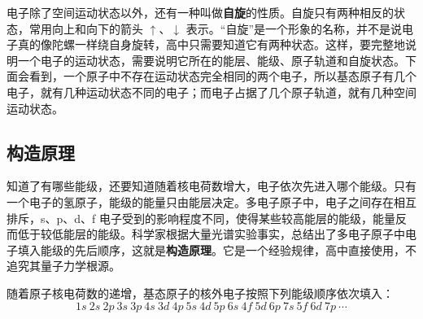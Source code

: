 
电子除了空间运动状态以外，还有一种叫做\textbf{自旋}的性质。自旋只有两种相反的状态，常用向上和向下的箭头 $\uparrow$、$\downarrow$ 表示。“自旋”是一个形象的名称，并不是说电子真的像陀螺一样绕自身旋转，高中只需要知道它有两种状态。这样，要完整地说明一个电子的运动状态，需要说明它所在的能层、能级、原子轨道和自旋状态。下面会看到，一个原子中不存在运动状态完全相同的两个电子，所以基态原子有几个电子，就有几种运动状态不同的电子；而电子占据了几个原子轨道，就有几种空间运动状态。

\subsection{构造原理}
知道了有哪些能级，还要知道随着核电荷数增大，电子依次先进入哪个能级。只有一个电子的氢原子，能级的能量只由能层决定。多电子原子中，电子之间存在相互排斥，s、p、d、f 电子受到的影响程度不同，使得某些较高能层的能级，能量反而低于较低能层的能级。科学家根据大量光谱实验事实，总结出了多电子原子中电子填入能级的先后顺序，这就是\textbf{构造原理}。它是一个经验规律，高中直接使用，不追究其量子力学根源。

\begin{gainian}[构造原理]
随着原子核电荷数的递增，基态原子的核外电子按照下列能级顺序依次填入：
\[1s\ 2s\ 2p\ 3s\ 3p\ 4s\ 3d\ 4p\ 5s\ 4d\ 5p\ 6s\ 4f\ 5d\ 6p\ 7s\ 5f\ 6d\ 7p\ \cdots\]
\end{gainian}

